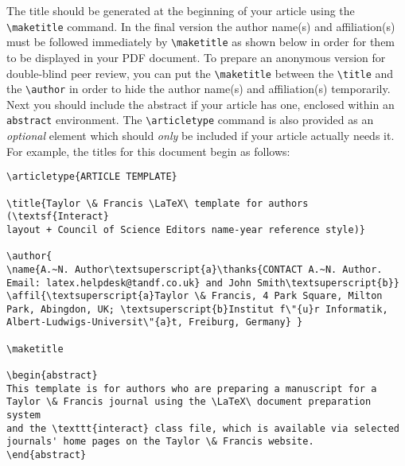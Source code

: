 \documentclass[]{interact}
\theoremstyle{plain}%
\theoremstyle{definition}
\theoremstyle{remark}
\begin{document}
The title should be generated at the beginning of your article using the \verb"\maketitle" command.
In the final version the author name(s) and affiliation(s) must be followed immediately by \verb"\maketitle" as shown below in order for them to be displayed in your PDF document.
To prepare an anonymous version for double-blind peer review, you can put the \verb"\maketitle" between the \verb"\title" and the \verb"\author" in order to hide the author name(s) and affiliation(s) temporarily.
Next you should include the abstract if your article has one, enclosed within an \texttt{abstract} environment.
The \verb"\articletype" command is also provided as an \emph{optional} element which should \emph{only} be included if your article actually needs it.
For example, the titles for this document begin as follows:
\begin{verbatim}
\articletype{ARTICLE TEMPLATE}

\title{Taylor \& Francis \LaTeX\ template for authors (\textsf{Interact}
layout + Council of Science Editors name-year reference style)}

\author{
\name{A.~N. Author\textsuperscript{a}\thanks{CONTACT A.~N. Author.
Email: latex.helpdesk@tandf.co.uk} and John Smith\textsuperscript{b}}
\affil{\textsuperscript{a}Taylor \& Francis, 4 Park Square, Milton
Park, Abingdon, UK; \textsuperscript{b}Institut f\"{u}r Informatik,
Albert-Ludwigs-Universit\"{a}t, Freiburg, Germany} }

\maketitle

\begin{abstract}
This template is for authors who are preparing a manuscript for a
Taylor \& Francis journal using the \LaTeX\ document preparation system
and the \texttt{interact} class file, which is available via selected
journals' home pages on the Taylor \& Francis website.
\end{abstract}
\end{verbatim}
\end{document}
